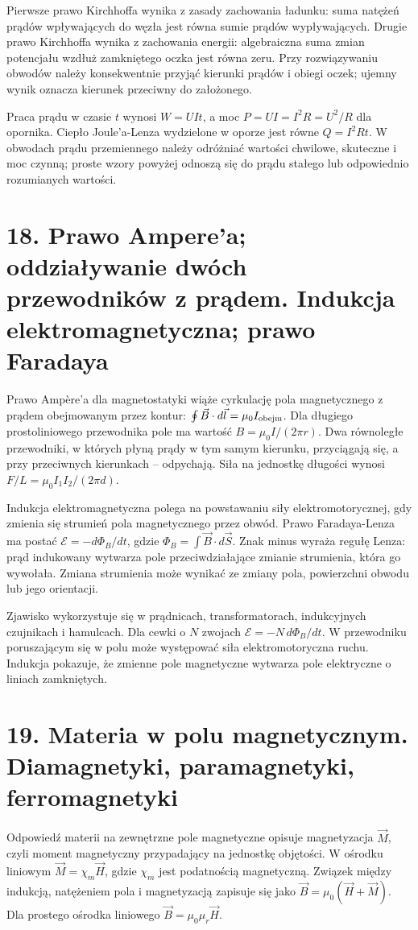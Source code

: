 \documentclass[11pt,a4paper,oneside]{report}
\begin{document}
Pierwsze prawo Kirchhoffa wynika z zasady zachowania ładunku: suma natężeń prądów wpływających do węzła jest równa sumie prądów wypływających. Drugie prawo Kirchhoffa wynika z zachowania energii: algebraiczna suma zmian potencjału wzdłuż zamkniętego oczka jest równa zeru. Przy rozwiązywaniu obwodów należy konsekwentnie przyjąć kierunki prądów i obiegi oczek; ujemny wynik oznacza kierunek przeciwny do założonego.

Praca prądu w czasie \(t\) wynosi \(W=UIt\), a moc \(P=UI=I^2R=U^2/R\) dla opornika. Ciepło Joule’a-Lenza wydzielone w oporze jest równe \(Q=I^2Rt\). W obwodach prądu przemiennego należy odróżniać wartości chwilowe, skuteczne i moc czynną; proste wzory powyżej odnoszą się do prądu stałego lub odpowiednio rozumianych wartości.

\section{18. Prawo Ampere'a; oddziaływanie dwóch przewodników z prądem. Indukcja elektromagnetyczna; prawo Faradaya}
Prawo Ampère’a dla magnetostatyki wiąże cyrkulację pola magnetycznego z prądem obejmowanym przez kontur: \(\oint\vec B\cdot d\vec l=\mu_0I_{\rm obejm}\). Dla długiego prostoliniowego przewodnika pole ma wartość \(B=\mu_0I/(2\pi r)\). Dwa równoległe przewodniki, w których płyną prądy w tym samym kierunku, przyciągają się, a przy przeciwnych kierunkach – odpychają. Siła na jednostkę długości wynosi \(F/L=\mu_0I_1I_2/(2\pi d)\).

Indukcja elektromagnetyczna polega na powstawaniu siły elektromotorycznej, gdy zmienia się strumień pola magnetycznego przez obwód. Prawo Faradaya-Lenza ma postać \(\mathcal E=-d\Phi_B/dt\), gdzie \(\Phi_B=\int\vec B\cdot d\vec S\). Znak minus wyraża regułę Lenza: prąd indukowany wytwarza pole przeciwdziałające zmianie strumienia, która go wywołała. Zmiana strumienia może wynikać ze zmiany pola, powierzchni obwodu lub jego orientacji.

Zjawisko wykorzystuje się w prądnicach, transformatorach, indukcyjnych czujnikach i hamulcach. Dla cewki o \(N\) zwojach \(\mathcal E=-N\,d\Phi_B/dt\). W przewodniku poruszającym się w polu może występować siła elektromotoryczna ruchu. Indukcja pokazuje, że zmienne pole magnetyczne wytwarza pole elektryczne o liniach zamkniętych.

\section{19. Materia w polu magnetycznym. Diamagnetyki, paramagnetyki, ferromagnetyki}
Odpowiedź materii na zewnętrzne pole magnetyczne opisuje magnetyzacja \(\vec M\), czyli moment magnetyczny przypadający na jednostkę objętości. W ośrodku liniowym \( \vec M=\chi_m\vec H\), gdzie \(\chi_m\) jest podatnością magnetyczną. Związek między indukcją, natężeniem pola i magnetyzacją zapisuje się jako \(\vec B=\mu_0(\vec H+\vec M)\). Dla prostego ośrodka liniowego \(\vec B=\mu_0\mu_r\vec H\).
\end{document}
